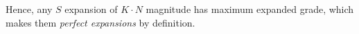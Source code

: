 \documentclass[12pt]{extarticle}
\begin{document}
Hence, any $S$ expansion of $K \cdot N$ magnitude has maximum expanded grade, which makes them \textit{perfect expansions} by definition.


%
%
%

\pagebreak
\printbibliography
\end{document}
